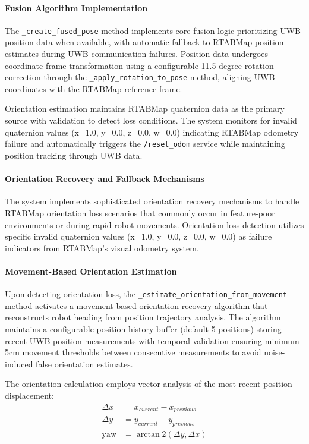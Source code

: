 \paragraph{Fusion Algorithm Implementation}

The \texttt{\_create\_fused\_pose} method implements core fusion logic prioritizing UWB position data when available, with automatic fallback to RTABMap position estimates during UWB communication failures. Position data undergoes coordinate frame transformation using a configurable 11.5-degree rotation correction through the \texttt{\_apply\_rotation\_to\_pose} method, aligning UWB coordinates with the RTABMap reference frame.

Orientation estimation maintains RTABMap quaternion data as the primary source with validation to detect loss conditions. The system monitors for invalid quaternion values (x=1.0, y=0.0, z=0.0, w=0.0) indicating RTABMap odometry failure and automatically triggers the \texttt{/reset\_odom} service while maintaining position tracking through UWB data.

\paragraph{Orientation Recovery and Fallback Mechanisms}

The system implements sophisticated orientation recovery mechanisms to handle RTABMap orientation loss scenarios that commonly occur in feature-poor environments or during rapid robot movements. Orientation loss detection utilizes specific invalid quaternion values (x=1.0, y=0.0, z=0.0, w=0.0) as failure indicators from RTABMap's visual odometry system.

\paragraph{Movement-Based Orientation Estimation}

Upon detecting orientation loss, the \texttt{\_estimate\_orientation\_from\_movement} method activates a movement-based orientation recovery algorithm that reconstructs robot heading from position trajectory analysis. The algorithm maintains a configurable position history buffer (default 5 positions) storing recent UWB position measurements with temporal validation ensuring minimum 5cm movement thresholds between consecutive measurements to avoid noise-induced false orientation estimates.

The orientation calculation employs vector analysis of the most recent position displacement:
\begin{align}
\Delta x &= x_{current} - x_{previous} \\
\Delta y &= y_{current} - y_{previous} \\
\text{yaw} &= \arctan2(\Delta y, \Delta x)
\end{align}

